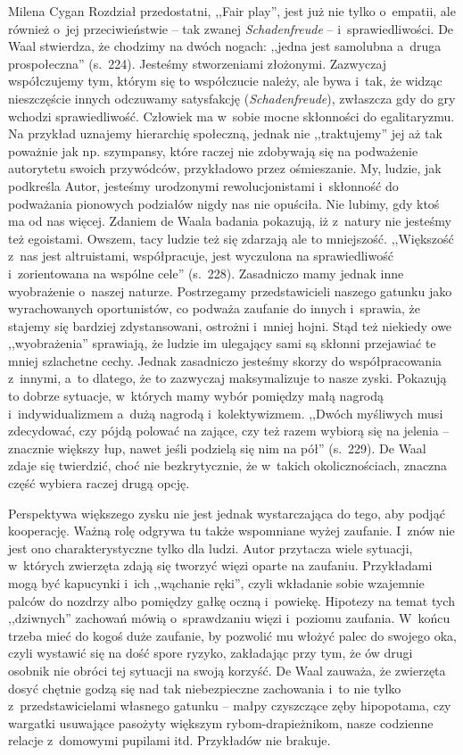 \begin{recplenv}{Milena Cygan}
Rozdział przedostatni, ,,Fair play'', jest już nie tylko o~empatii, ale również o~jej przeciwieństwie -- tak zwanej
\textit{Schadenfreude} -- i~sprawiedliwości. De Waal stwierdza, że chodzimy na dwóch nogach: ,,jedna jest
samolubna a~druga prospołeczna'' (s.~224). Jesteśmy stworzeniami złożonymi. Zazwyczaj współczujemy tym, którym się to współczucie
należy, ale bywa i~tak, że widząc nieszczęście innych odczuwamy satysfakcję (\textit{Schadenfreude}), zwłaszcza gdy do
gry wchodzi sprawiedliwość. Człowiek ma w~sobie mocne skłonności do egalitaryzmu. Na przykład uznajemy hierarchię
społeczną, jednak nie ,,traktujemy'' jej aż tak poważnie jak np. szympansy, które raczej nie zdobywają się na podważenie
autorytetu swoich przywódców, przykładowo przez ośmieszanie. My, ludzie, jak podkreśla Autor, jesteśmy urodzonymi
rewolucjonistami i~skłonność do podważania pionowych podziałów nigdy nas nie opuściła. Nie lubimy, gdy ktoś ma od nas
więcej. Zdaniem de Waala badania pokazują, iż z~natury nie jesteśmy też egoistami. Owszem, tacy ludzie też się zdarzają
ale to mniejszość. ,,Większość z~nas jest altruistami, współpracuje, jest wyczulona na sprawiedliwość i~zorientowana na
wspólne cele'' (s.~228). Zasadniczo mamy jednak inne wyobrażenie o~naszej naturze. Postrzegamy przedstawicieli naszego
gatunku jako wyrachowanych oportunistów, co podważa zaufanie do innych i~sprawia, że stajemy się bardziej
zdystansowani, ostrożni i~mniej hojni. Stąd też niekiedy owe ,,wyobrażenia'' sprawiają, że ludzie im ulegający sami są
skłonni przejawiać te mniej szlachetne cechy. Jednak zasadniczo jesteśmy skorzy do współpracowania z~innymi, a~to
dlatego, że to zazwyczaj maksymalizuje to nasze zyski. Pokazują to dobrze sytuacje, w~których mamy wybór pomiędzy małą
nagrodą i~indywidualizmem a~dużą nagrodą i~kolektywizmem. ,,Dwóch myśliwych musi zdecydować, czy pójdą polować na
zające, czy też razem wybiorą się na jelenia -- znacznie większy łup, nawet jeśli podzielą się nim na pół'' (s.~229). De
Waal zdaje się twierdzić, choć nie bezkrytycznie, że w~takich okolicznościach, znaczna część wybiera raczej drugą
opcję.

\enlargethispage{-.5\baselineskip}

Perspektywa większego zysku nie jest jednak wystarczająca do tego, aby podjąć kooperację. Ważną rolę odgrywa tu także
wspomniane wyżej zaufanie. I~znów nie jest ono charakterystyczne tylko dla ludzi. Autor przytacza wiele
sytuacji, w~których zwierzęta zdają się tworzyć więzi oparte na zaufaniu. Przykładami mogą być kapucynki i~ich ,,wąchanie ręki'',
czyli wkładanie sobie wzajemnie palców do nozdrzy albo pomiędzy gałkę oczną i~powiekę. Hipotezy na temat tych
,,dziwnych'' zachowań mówią o~sprawdzaniu więzi i~poziomu zaufania. W~końcu trzeba mieć do kogoś duże zaufanie, by
pozwolić mu włożyć palec do swojego oka, czyli wystawić się na dość spore ryzyko, zakładając przy tym, że ów drugi
osobnik nie obróci tej sytuacji na swoją korzyść. De Waal zauważa, że zwierzęta dosyć chętnie godzą się nad tak
niebezpieczne zachowania i~to nie tylko z~przedstawicielami własnego gatunku -- małpy czyszczące zęby hipopotama, czy
wargatki usuwające pasożyty większym rybom-drapieżnikom, nasze codzienne relacje z~domowymi pupilami itd. Przykładów
nie brakuje. 


\end{recplenv}
